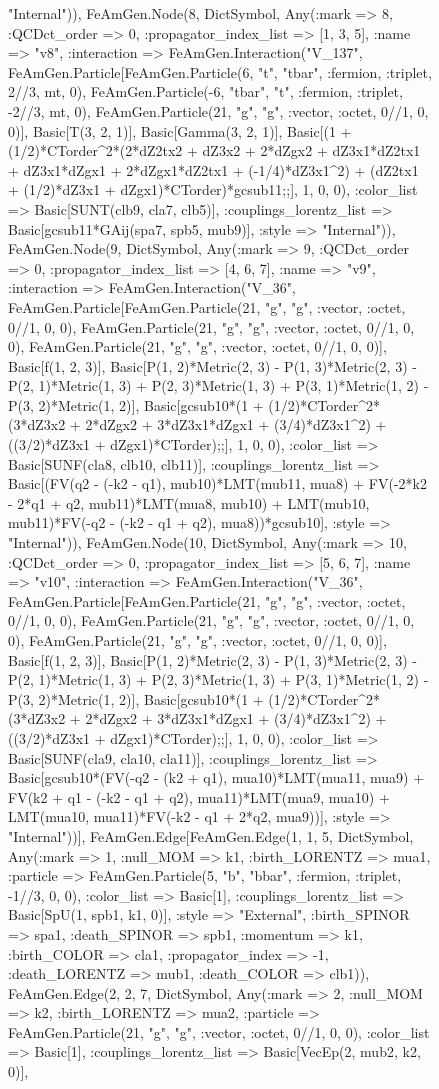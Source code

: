 \documentclass{revtex4}
\begin{document}
\begin{figure}[!htb]
\begin{center}
{"Internal")), FeAmGen.Node(8, Dict{Symbol, Any}(:mark => 8, :QCDct_order => 0, :propagator_index_list => [1, 3, 5], :name => "v8", :interaction => FeAmGen.Interaction("V_137", FeAmGen.Particle[FeAmGen.Particle(6, "t", "tbar", :fermion, :triplet, 2//3, mt, 0), FeAmGen.Particle(-6, "tbar", "t", :fermion, :triplet, -2//3, mt, 0), FeAmGen.Particle(21, "g", "g", :vector, :octet, 0//1, 0, 0)], Basic[T(3, 2, 1)], Basic[Gamma(3, 2, 1)], Basic[(1 + (1/2)*CTorder^2*(2*dZ2tx2 + dZ3x2 + 2*dZgx2 + dZ3x1*dZ2tx1 + dZ3x1*dZgx1 + 2*dZgx1*dZ2tx1 + (-1/4)*dZ3x1^2) + (dZ2tx1 + (1/2)*dZ3x1 + dZgx1)*CTorder)*gcsub11;;], 1, 0, 0), :color_list => Basic[SUNT(clb9, cla7, clb5)], :couplings_lorentz_list => Basic[gcsub11*GAij(spa7, spb5, mub9)], :style => "Internal")), FeAmGen.Node(9, Dict{Symbol, Any}(:mark => 9, :QCDct_order => 0, :propagator_index_list => [4, 6, 7], :name => "v9", :interaction => FeAmGen.Interaction("V_36", FeAmGen.Particle[FeAmGen.Particle(21, "g", "g", :vector, :octet, 0//1, 0, 0), FeAmGen.Particle(21, "g", "g", :vector, :octet, 0//1, 0, 0), FeAmGen.Particle(21, "g", "g", :vector, :octet, 0//1, 0, 0)], Basic[f(1, 2, 3)], Basic[P(1, 2)*Metric(2, 3) - P(1, 3)*Metric(2, 3) - P(2, 1)*Metric(1, 3) + P(2, 3)*Metric(1, 3) + P(3, 1)*Metric(1, 2) - P(3, 2)*Metric(1, 2)], Basic[gcsub10*(1 + (1/2)*CTorder^2*(3*dZ3x2 + 2*dZgx2 + 3*dZ3x1*dZgx1 + (3/4)*dZ3x1^2) + ((3/2)*dZ3x1 + dZgx1)*CTorder);;], 1, 0, 0), :color_list => Basic[SUNF(cla8, clb10, clb11)], :couplings_lorentz_list => Basic[(FV(q2 - (-k2 - q1), mub10)*LMT(mub11, mua8) + FV(-2*k2 - 2*q1 + q2, mub11)*LMT(mua8, mub10) + LMT(mub10, mub11)*FV(-q2 - (-k2 - q1 + q2), mua8))*gcsub10], :style => "Internal")), FeAmGen.Node(10, Dict{Symbol, Any}(:mark => 10, :QCDct_order => 0, :propagator_index_list => [5, 6, 7], :name => "v10", :interaction => FeAmGen.Interaction("V_36", FeAmGen.Particle[FeAmGen.Particle(21, "g", "g", :vector, :octet, 0//1, 0, 0), FeAmGen.Particle(21, "g", "g", :vector, :octet, 0//1, 0, 0), FeAmGen.Particle(21, "g", "g", :vector, :octet, 0//1, 0, 0)], Basic[f(1, 2, 3)], Basic[P(1, 2)*Metric(2, 3) - P(1, 3)*Metric(2, 3) - P(2, 1)*Metric(1, 3) + P(2, 3)*Metric(1, 3) + P(3, 1)*Metric(1, 2) - P(3, 2)*Metric(1, 2)], Basic[gcsub10*(1 + (1/2)*CTorder^2*(3*dZ3x2 + 2*dZgx2 + 3*dZ3x1*dZgx1 + (3/4)*dZ3x1^2) + ((3/2)*dZ3x1 + dZgx1)*CTorder);;], 1, 0, 0), :color_list => Basic[SUNF(cla9, cla10, cla11)], :couplings_lorentz_list => Basic[gcsub10*(FV(-q2 - (k2 + q1), mua10)*LMT(mua11, mua9) + FV(k2 + q1 - (-k2 - q1 + q2), mua11)*LMT(mua9, mua10) + LMT(mua10, mua11)*FV(-k2 - q1 + 2*q2, mua9))], :style => "Internal"))], FeAmGen.Edge[FeAmGen.Edge(1, 1, 5, Dict{Symbol, Any}(:mark => 1, :null_MOM => k1, :birth_LORENTZ => mua1, :particle => FeAmGen.Particle(5, "b", "bbar", :fermion, :triplet, -1//3, 0, 0), :color_list => Basic[1], :couplings_lorentz_list => Basic[SpU(1, spb1, k1, 0)], :style => "External", :birth_SPINOR => spa1, :death_SPINOR => spb1, :momentum => k1, :birth_COLOR => cla1, :propagator_index => -1, :death_LORENTZ => mub1, :death_COLOR => clb1)), FeAmGen.Edge(2, 2, 7, Dict{Symbol, Any}(:mark => 2, :null_MOM => k2, :birth_LORENTZ => mua2, :particle => FeAmGen.Particle(21, "g", "g", :vector, :octet, 0//1, 0, 0), :color_list => Basic[1], :couplings_lorentz_list => Basic[VecEp(2, mub2, k2, 0)], }
\end{center}
\end{figure}
\end{document}
